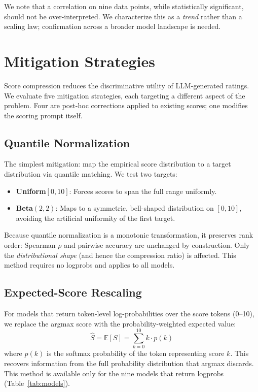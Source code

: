 \documentclass[11pt]{article}
\begin{document}
We note that a correlation on nine data points, while statistically significant, should not be over-interpreted. We characterize this as a \emph{trend} rather than a scaling law; confirmation across a broader model landscape is needed.

\section{Mitigation Strategies}
\label{sec:mitigation}

Score compression reduces the discriminative utility of LLM-generated ratings. We evaluate five mitigation strategies, each targeting a different aspect of the problem. Four are post-hoc corrections applied to existing scores; one modifies the scoring prompt itself.

\subsection{Quantile Normalization}

The simplest mitigation: map the empirical score distribution to a target distribution via quantile matching. We test two targets:
\begin{itemize}[nosep]
    \item \textbf{Uniform$[0, 10]$}: Forces scores to span the full range uniformly.
    \item \textbf{Beta$(2, 2)$}: Maps to a symmetric, bell-shaped distribution on $[0, 10]$, avoiding the artificial uniformity of the first target.
\end{itemize}
Because quantile normalization is a monotonic transformation, it preserves rank order: Spearman $\rho$ and pairwise accuracy are unchanged by construction. Only the \emph{distributional shape} (and hence the compression ratio) is affected. This method requires no logprobs and applies to all models.

\subsection{Expected-Score Rescaling}

For models that return token-level log-probabilities over the score tokens (0--10), we replace the argmax score with the probability-weighted expected value:
\begin{equation}
    \hat{S} = \mathbb{E}[S] = \sum_{k=0}^{10} k \cdot p(k)
\end{equation}
where $p(k)$ is the softmax probability of the token representing score $k$. This recovers information from the full probability distribution that argmax discards. This method is available only for the nine models that return logprobs (Table~\ref{tab:models}).
\end{document}
